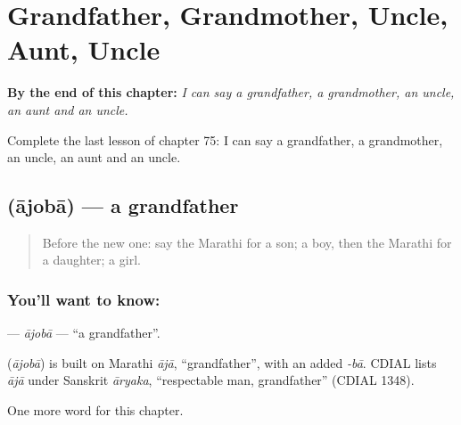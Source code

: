 
\chapter{Grandfather, Grandmother, Uncle, Aunt, Uncle}
\label{ch:mr-grandfather-grandmother-uncle-aunt-uncle}

\begin{chapteropening}
\textbf{By the end of this chapter:} \emph{I can say a grandfather, a grandmother, an uncle, an aunt and an uncle.}

Complete the last lesson of chapter 75: I can say a grandfather, a grandmother, an uncle, an aunt and an uncle.
\end{chapteropening}

\section[\texorpdfstring{\mr{आजोबा} (ājobā)}{आजोबा (ājobā)}]{ (ājobā) — a grandfather}

\label{lesson:MR-C75-ajoba}



\begin{quote}
Before the new one: say the Marathi for a son; a boy, then the Marathi for a daughter; a girl.
\end{quote}

\subsection*{You'll want to know: }
\textbf{} — \emph{ājobā} — \textquotedblleft{}a grandfather\textquotedblright{}.

\begin{cousinweb}
\textbf{} (\emph{ājobā}) is built on Marathi \emph{ājā}, \textquotedblleft{}grandfather\textquotedblright{}, with an added \emph{-bā}. CDIAL lists \emph{ājā} under Sanskrit \emph{āryaka}, \textquotedblleft{}respectable man, grandfather\textquotedblright{} (CDIAL 1348).
\end{cousinweb}

\begin{grammarlens}[title={What you've built}]
One more word for this chapter.
\end{grammarlens}

